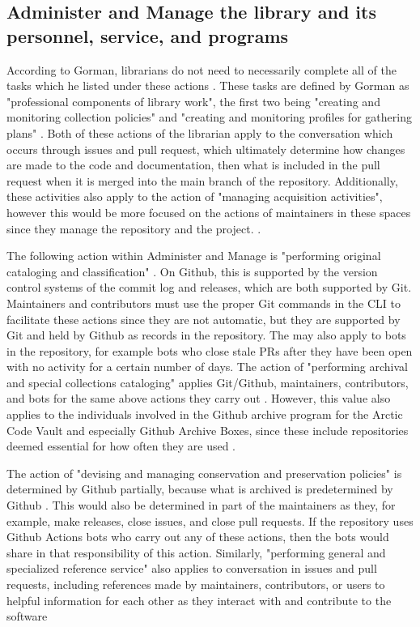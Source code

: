 \subsection{Administer and Manage the library and its personnel, service, and programs}
According to Gorman, librarians do not need to necessarily complete all of the tasks which he listed under these actions \cite{gorman2000values}. These tasks are defined by Gorman as "professional components of library work", the first two being "creating and monitoring collection policies" and "creating and monitoring profiles for gathering plans"  \cite{gorman2000values}. Both of these actions of the librarian apply to the conversation which occurs through issues and pull request, which ultimately determine how changes are made to the code and documentation, then what is included in the pull request when it is merged into the main branch of the repository. Additionally, these activities also apply to the action of "managing acquisition activities", however this would be more focused on the actions of maintainers in these spaces since they manage the repository and the project.  \cite{gorman2000values}. 

The following action within Administer and Manage is "performing original cataloging and classification" \cite{gorman2000values}. On Github, this is supported by the version control systems of the commit log and releases, which are both supported by Git. Maintainers and contributors must use the proper Git commands in the CLI to facilitate these actions since they are not automatic, but they are supported by Git and held by Github as records in the repository. The may also apply to bots in the repository, for example bots who close stale PRs after they have been open with no activity for a certain number of days. The action of "performing archival and special collections cataloging" applies Git/Github, maintainers, contributors, and bots for the same above actions they carry out \cite{gorman2000values}. However, this value also applies to the individuals involved in the Github archive program for the Arctic Code Vault and especially Github Archive Boxes, since these include repositories deemed essential for how often they are used \cite{githubarchiveboxes} \cite{arcticcodevault}.

The action of "devising and managing conservation and preservation policies" is determined by Github partially, because what is archived is predetermined by Github \cite{gorman2000values}. This would also be determined in part of the maintainers as they, for example, make releases, close issues, and close pull requests. If the repository uses Github Actions bots who carry out any of these actions, then the bots would share in that responsibility of this action. Similarly, "performing general and specialized reference service" \cite{gorman2000values} also applies to conversation in issues and pull requests, including references made by maintainers, contributors, or users to helpful information for each other as they interact with and contribute to the software 

